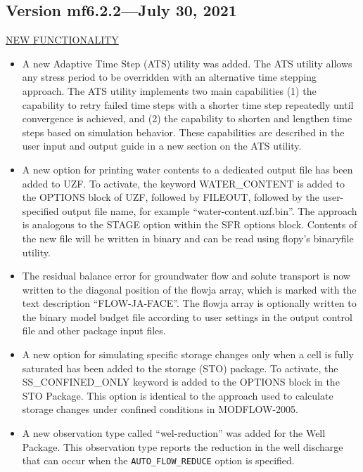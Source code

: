 	\subsection{Version mf6.2.2---July 30, 2021}

	\underline{NEW FUNCTIONALITY}
	\begin{itemize}
	        \item A new Adaptive Time Step (ATS) utility was added.  The ATS utility allows any stress period to be overridden with an alternative time stepping approach.  The ATS utility implements two main capabilities (1) the capability to retry failed time steps with a shorter time step repeatedly until convergence is achieved, and (2) the capability to shorten and lengthen time steps based on simulation behavior.  These capabilities are described in the user input and output guide in a new section on the ATS utility.
	        \item A new option for printing water contents to a dedicated output file has been added to UZF.  To activate, the keyword WATER\_CONTENT is added to the OPTIONS block of UZF, followed by FILEOUT, followed by the user-specified output file name, for example ``water-content.uzf.bin''.  The approach is analogous to the STAGE option within the SFR options block.  Contents of the new file will be written in binary and can be read using flopy's binaryfile utility.  
	        \item The residual balance error for groundwater flow and solute transport is now written to the diagonal position of the flowja array, which is marked with the text description ``FLOW-JA-FACE''.  The flowja array is optionally written to the binary model budget file according to user settings in the output control file and other package input files.
	        \item A new option for simulating specific storage changes only when a cell is fully saturated has been added to the storage (STO) package. To activate, the SS\_CONFINED\_ONLY keyword is added to the OPTIONS block in the STO Package. This option is identical to the approach used to calculate storage changes under confined conditions in MODFLOW-2005.
	        \item A new observation type called ``wel-reduction'' was added for the Well Package.  This observation type reports the reduction in the well discharge that can occur when the \texttt{AUTO\_FLOW\_REDUCE} option is specified.
	\end{itemize}
	
